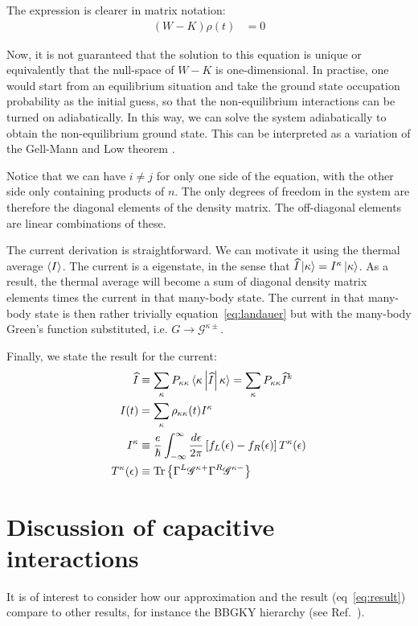 The expression is clearer in matrix notation:
\begin{align*}
    \left(W-K\right) \rho(t) &= 0
\end{align*}

Now, it is not guaranteed that the solution to this equation is unique or equivalently that the null-space of $W-K$ is one-dimensional. In practise, one would start from an equilibrium situation and take the ground state occupation probability as the initial guess, so that the non-equilibrium interactions can be turned on adiabatically. In this way, we can solve the system adiabatically to obtain the non-equilibrium ground state. This can be interpreted as a variation of the Gell-Mann and Low theorem \cite{gellmannlow, molinari}.

Notice that we can have $i\neq j$ for only one side of the equation, with the other side only containing products of $n$. The only degrees of freedom in the system are therefore the diagonal elements of the density matrix. The off-diagonal elements are linear combinations of these.

The current derivation is straightforward. We can motivate it using the thermal average $\braket{I}$. The current is a eigenstate, in the sense that $ \widehat{I} \ket{\kappa} = I^\kappa \ket{\kappa}$. As a result, the thermal average will become a sum of diagonal density matrix elements times the current in that many-body state. The current in that many-body state is then rather trivially equation~\ref{eq:landauer} but with the many-body Green's function substituted, i.e. $G \rightarrow \mathscr{G}^{\kappa\pm}$.

Finally, we state the result for the current:
\begin{align*}
\widehat{I} &\equiv \sum_\kappa P_{\kappa\kappa} \braket{ \kappa \left|\widehat{I}\right|\kappa}=\sum_\kappa P_{\kappa\kappa} \widehat{I}^k\\ 
I(t) &= \sum_\kappa \rho_{\kappa\kappa}(t) I^\kappa \\
I^\kappa&\equiv \frac{e}{\hslash} \int^\infty_{-\infty} \frac{d\epsilon}{2\pi} \left[ f_L(\epsilon) - f_R (\epsilon) \right] T^\kappa (\epsilon)\\
T^\kappa(\epsilon) &\equiv \text{Tr}\left\{ \Gamma^L \mathscr{G}^{\kappa+} \Gamma^R \mathscr{G}^{\kappa-} \right\}
\end{align*}



\section{Discussion of capacitive interactions}
\label{sec:discussioncapacitive}
It is of interest to consider how our approximation and the result (eq~\ref{eq:result}) compare to other results, for instance the BBGKY hierarchy (see Ref.~\cite{diventra}).

